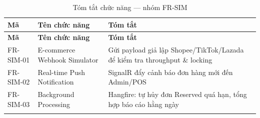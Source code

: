 \begin{longtable}{|p{2cm}|p{4.5cm}|p{7cm}|}
    \hline
    \textbf{Mã} & \textbf{Tên chức năng} & \textbf{Tóm tắt} \\
    \hline
    \endfirsthead
    \hline
    \textbf{Mã} & \textbf{Tên chức năng} & \textbf{Tóm tắt} \\
    \hline
    \endhead
    FR-SIM-01 & E-commerce Webhook Simulator & Gửi payload giả lập Shopee/TikTok/Lazada để kiểm tra throughput \& locking \\
    \hline
    FR-SIM-02 & Real-time Push Notification & SignalR đẩy cảnh báo đơn hàng mới đến Admin/POS \\
    \hline
    FR-SIM-03 & Background Processing & Hangfire: tự hủy đơn Reserved quá hạn, tổng hợp báo cáo hằng ngày \\
    \hline
    \caption{Tóm tắt chức năng — nhóm FR-SIM}
\end{longtable}
\FloatBarrier
